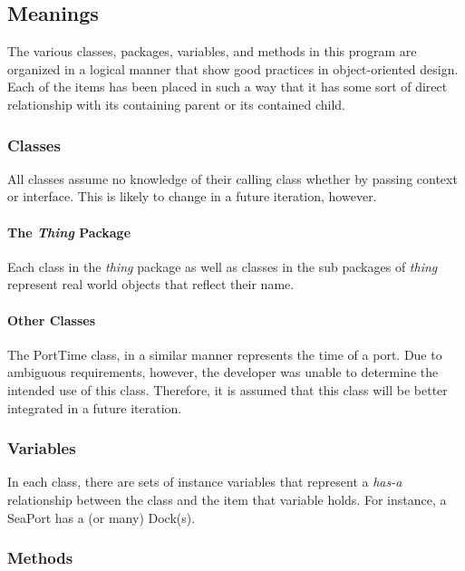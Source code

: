 \documentclass[english,floatsintext,man]{apa6}
\begin{document}
\subsection{Meanings}\label{meanings}

The various classes, packages, variables, and methods in this program
are organized in a logical manner that show good practices in
object-oriented design. Each of the items has been placed in such a way
that it has some sort of direct relationship with its containing parent
or its contained child.

\subsubsection{Classes}\label{classes}

All classes assume no knowledge of their calling class whether by
passing context or interface. This is likely to change in a future
iteration, however.

\paragraph{\texorpdfstring{The \emph{Thing}
Package}{The Thing Package}}\label{the-thing-package}

Each class in the \emph{thing} package as well as classes in the sub
packages of \emph{thing} represent real world objects that reflect their
name.

\paragraph{Other Classes}\label{other-classes}

The PortTime class, in a similar manner represents the time of a port.
Due to ambiguous requirements, however, the developer was unable to
determine the intended use of this class. Therefore, it is assumed that
this class will be better integrated in a future iteration.

\subsubsection{Variables}\label{variables}

In each class, there are sets of instance variables that represent a
\emph{has-a} relationship between the class and the item that variable
holds. For instance, a SeaPort has a (or many) Dock(s).

\subsubsection{Methods}\label{methods}
\end{document}
